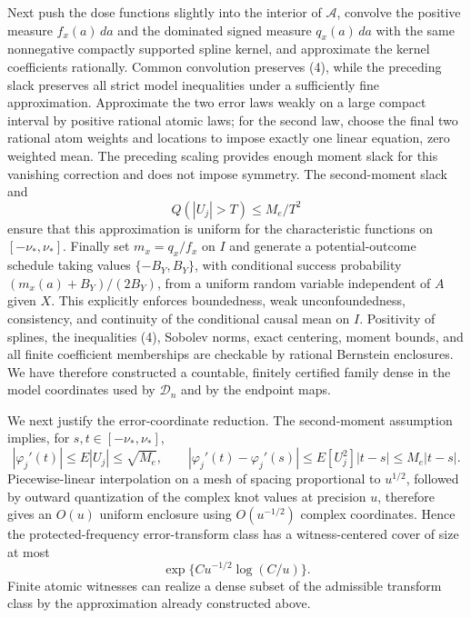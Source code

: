 Next push the dose functions slightly into the interior of \(\mathcal A\), convolve the positive measure \(f_x(a)\,da\) and the dominated signed measure \(q_x(a)\,da\) with the same nonnegative compactly supported spline kernel, and approximate the kernel coefficients rationally.  Common convolution preserves (4), while the preceding slack preserves all strict model inequalities under a sufficiently fine approximation.  Approximate the two error laws weakly on a large compact interval by positive rational atomic laws; for the second law, choose the final two rational atom weights and locations to impose exactly one linear equation, zero weighted mean.  The preceding scaling provides enough moment slack for this vanishing correction and does not impose symmetry.  The second-moment slack and
\[
 Q(|U_j|>T)\le M_e/T^2                                      \tag{5}
\]
ensure that this approximation is uniform for the characteristic functions on \([ -\nu_*,\nu_*]\).  Finally set \(m_x=q_x/f_x\) on \(I\) and generate a potential-outcome schedule taking values \(\{-B_Y,B_Y\}\), with conditional success probability \((m_x(a)+B_Y)/(2B_Y)\), from a uniform random variable independent of \(A\) given \(X\).  This explicitly enforces boundedness, weak unconfoundedness, consistency, and continuity of the conditional causal mean on \(I\).  Positivity of splines, the inequalities (4), Sobolev norms, exact centering, moment bounds, and all finite coefficient memberships are checkable by rational Bernstein enclosures.  We have therefore constructed a countable, finitely certified family dense in the model coordinates used by \(\mathscr D_n\) and by the endpoint maps.

We next justify the error-coordinate reduction.  The second-moment assumption implies, for \(s,t\in[-\nu_*,\nu_*]\),
\[
 |\varphi_j'(t)|\le E|U_j|\le\sqrt{M_e},
 \qquad
 |\varphi_j'(t)-\varphi_j'(s)|
 \le E[U_j^2]|t-s|\le M_e|t-s|.                              \tag{6}
\]
Piecewise-linear interpolation on a mesh of spacing proportional to \(u^{1/2}\), followed by outward quantization of the complex knot values at precision \(u\), therefore gives an \(O(u)\) uniform enclosure using \(O(u^{-1/2})\) complex coordinates.  Hence the protected-frequency error-transform class has a witness-centered cover of size at most
\[
 \exp\{C u^{-1/2}\log(C/u)\}.                                \tag{7}
\]
Finite atomic witnesses can realize a dense subset of the admissible transform class by the approximation already constructed above.

